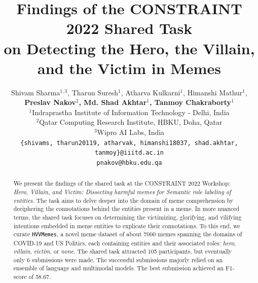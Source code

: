 \documentclass[11pt]{article}
\title{Findings of the CONSTRAINT 2022 Shared Task\\ on Detecting the Hero, the Villain, and the Victim in Memes}
\author{Shivam Sharma$^{1,3}$, Tharun Suresh$^1$, Atharva Kulkarni$^1$, Himanshi Mathur$^{1}$,\\ \textbf{Preslav Nakov$^2$, Md. Shad Akhtar$^1$, Tanmoy Chakraborty$^1$}\\
  $^1$Indraprastha Institute of Information Technology - Delhi, India  \\
  $^2$Qatar Computing Research Institute, HBKU, Doha, Qatar \\
  $^3$Wipro AI Labs, India\\
  \small\texttt{\{shivams, tharun20119, atharvak, himanshi18037, shad.akhtar, tanmoy\}@iiitd.ac.in}\\\small\texttt{pnakov@hbku.edu.qa}}
\newcommand{\dataset}{\textcolor{black}{\texttt{HVVMemes}}}
\newcommand{\model}{\texttt{MeRaiM}}
\begin{document}
\maketitle
\begin{abstract}

We present the findings of the shared task at the CONSTRAINT 2022 Workshop: \textit{Hero, Villain, and Victim: Dissecting harmful memes for Semantic role labeling of entities}. The task aims to delve deeper into the domain of meme comprehension by deciphering the connotations behind the entities present in a meme. In more nuanced terms, the shared task focuses on determining the victimizing, glorifying, and vilifying intentions embedded in meme entities to explicate their connotations. To this end, we curate \dataset, a novel meme dataset of about 7000 memes spanning the domains of COVID-19 and US Politics, each containing entities and their associated roles: \emph{hero}, \emph{villain}, \emph{victim}, or \emph{none}. The shared task attracted 105 participants, but eventually only 6 submissions were made. The successful submissions majorly relied on an ensemble of language and multimodal models. The best submission achieved an F1-score of 58.67.
\end{abstract}
\end{document}
